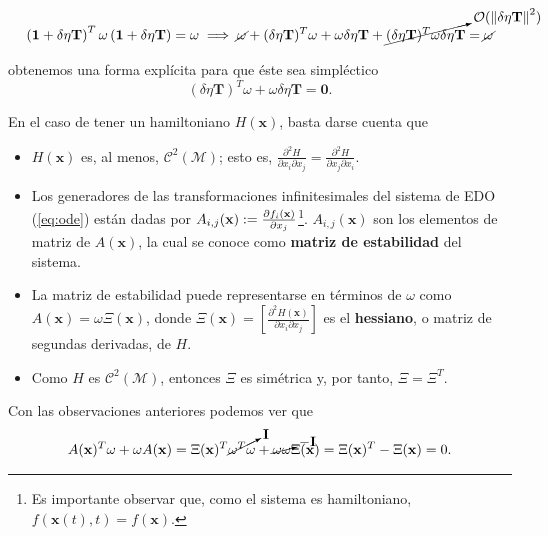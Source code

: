 \begin{align*}
  \left( \mathbf{1} + \delta \eta \mathbf{T} \right)^T \omega \left( \mathbf{1} + \delta \eta \mathbf{T} \right) = \omega \implies 
  \cancel{\omega} + (\delta \eta \mathbf{T})^T \omega + \omega \delta \eta \mathbf{T} + \cancelto{\mathcal{O}(\left\lVert\delta \eta \mathbf{T}\right\rVert^2)} {(\delta \eta \mathbf{T})^T \omega \delta \eta \mathbf{T}} = \cancel{\omega}  
\end{align*}

obtenemos una forma explícita para que éste sea simpléctico
\begin{equation}
  (\delta \eta \mathbf{T})^T \omega + \omega \delta \eta \mathbf{T} = \mathbf{0}.
  \label{eq:eq:symplectic_condition2}
\end{equation}

En el caso de tener un hamiltoniano $H(\mathbf{x})$, basta darse cuenta que
\begin{itemize}
\item $H(\mathbf{x})$ es, al menos, $\mathcal{C}^2(\mathcal{M})$; esto es, $\frac{\partial^2 H}{\partial x_i \partial x_j} = \frac{\partial^2 H}{\partial x_j \partial x_i}$.

\item Los generadores de las transformaciones infinitesimales del sistema de EDO (\ref{eq:ode}) están dadas por $A_{i,j}(\mathbf{x}) := \frac{\partial f_i(\mathbf{x})}{\partial x_j}$\footnote{Es importante observar que, como el sistema es hamiltoniano, $f(\mathbf{x}(t),t) = f(\mathbf{x})$.}. $A_{i,j}(\mathbf{x})$ son los elementos de matriz de $A(\mathbf{x})$, la cual se conoce como \textbf{matriz de estabilidad} del sistema.

\item La matriz de estabilidad puede representarse en términos de $\omega$ como $A(\mathbf{x}) = \omega \Xi(\mathbf{x})$, donde $\Xi(\mathbf{x}) = \left[ \frac{\partial^2 H(\mathbf{x})}{\partial x_i \partial x_j} \right]$ es el \textbf{hessiano}, o matriz de segundas derivadas, de $H$.

\item Como $H$ es $\mathcal{C}^2(\mathcal{M})$, entonces $\Xi$ es simétrica y, por tanto, $\Xi = \Xi^T$.
\end{itemize}

Con las observaciones anteriores podemos ver que
\begin{align*}
 A(\mathbf{x})^T \omega + \omega A(\mathbf{x}) = \Xi(\mathbf{x})^T \cancelto{\mathbf{I}}{\omega^T \omega} + \cancelto{-\mathbf{I}}{\omega \omega}\Xi(\mathbf{x}) = \Xi(\mathbf{x})^T - \Xi(\mathbf{x}) = 0.
\end{align*}

